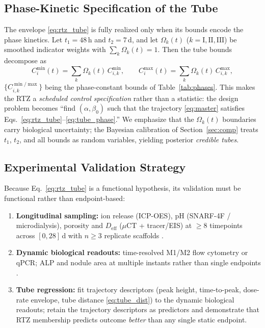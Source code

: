 \documentclass[11pt]{article}
\newcommand{\Veff}{D_{\mathrm{eff}}}
\begin{document}
\subsection{Phase-Kinetic Specification of the Tube}


The envelope \eqref{eq:rtz_tube} is fully realized only when its bounds encode the phase kinetics. Let $t_1=48$\,h and $t_2=7$\,d, and let $\Omega_k(t)$ ($k=\mathrm{I,II,III}$) be smoothed indicator weights with $\sum_k\Omega_k(t)=1$. Then the tube bounds decompose as
\begin{equation}
C_{i}^{\min}(t)=\sum_{k}\Omega_k(t)\,C_{i,k}^{\min},\qquad
C_{i}^{\max}(t)=\sum_{k}\Omega_k(t)\,C_{i,k}^{\max},
\label{eq:tube_phase}
\end{equation}
$\{C_{i,k}^{\min/\max}\}$ being the phase-constant bounds of Table~\ref{tab:phases}. This makes the RTZ a \emph{scheduled control specification} rather than a statistic: the design problem becomes ``find $(\alpha,\beta_0)$ such that the trajectory \eqref{eq:master} satisfies Eqs.~\eqref{eq:rtz_tube}--\eqref{eq:tube_phase}.'' We emphasize that the $\Omega_k(t)$ boundaries carry biological uncertainty; the Bayesian calibration of Section~\ref{sec:comp} treats $t_1$, $t_2$, and all bounds as random variables, yielding posterior \emph{credible tubes}.


\subsection{Experimental Validation Strategy}

Because Eq.~\eqref{eq:rtz_tube} is a functional hypothesis, its validation must be functional rather than endpoint-based:

\begin{enumerate}[leftmargin=1.6em]
\item \textbf{Longitudinal sampling:} ion release (ICP-OES), pH (SNARF-4F / microdialysis), porosity and $\Veff$ ($\mu$CT + tracer/EIS) at $\geq8$ timepoints across $[0,28]$\,d with $n\geq3$ replicate scaffolds \cite{Workie2026c,Elsayed2017}.
\item \textbf{Dynamic biological readouts:} time-resolved M1/M2 flow cytometry or qPCR; ALP and nodule area at multiple instants rather than single endpoints \cite{Workie2023,Polo-Montalvo2021}.
\item \textbf{Tube regression:} fit trajectory descriptors (peak height, time-to-peak, dose-rate envelope, tube distance \eqref{eq:tube_dist}) to the dynamic biological readouts; retain the trajectory descriptors as predictors and demonstrate that RTZ membership predicts outcome \emph{better} than any single static endpoint.
\end{enumerate}
\end{document}
